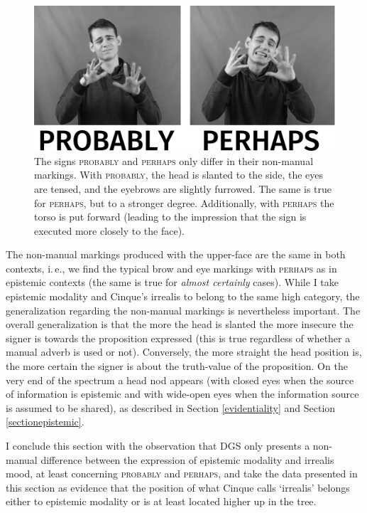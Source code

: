 \begin{figure}[bt]
\centering
	\includegraphics[width=1.0\textwidth]{probablyperhaps2sw.jpg}
	\caption{The signs \textsc{probably} and \textsc{perhaps} only differ in their non-manual markings. With \textsc{probably}, the head is slanted to the side, the eyes are tensed, and the eyebrows are slightly furrowed. The same is true for \textsc{perhaps}, but to a stronger degree. Additionally, with \textsc{perhaps} the torso is put forward (leading to the impression that the sign is executed more closely to the face).}
	\label{fig:probablyperhaps}
\end{figure}

The non-manual markings produced with the upper-face are the same in both contexts, i.\,e., we find the typical brow and eye markings with \textsc{perhaps} as in epistemic contexts (the same is true for \textit{almost certainly} cases). While I take epistemic modality and Cinque's irrealis to belong to the same high category, the generalization regarding the non-manual markings is nevertheless important. The overall generalization is that the more the head is slanted the more insecure the signer is towards the proposition expressed (this is true regardless of whether a manual adverb is used or not). Conversely, the more straight the head position is, the more certain the signer is about the truth-value of the proposition. On the very end of the spectrum a head nod appears (with closed eyes when the source of information is epistemic and with wide-open eyes when the information source is assumed to be shared), as described in Section \ref{evidentiality} and Section \ref{sectionepistemic}.

I conclude this section with the observation that DGS only presents a non-manual difference between the expression of epistemic modality and irrealis mood, at least concerning \textsc{probably} and \textsc{perhaps}, and take the data presented in this section as evidence that the position of what Cinque calls `irrealis' belongs either to epistemic modality or is at least located higher up in the tree. 

